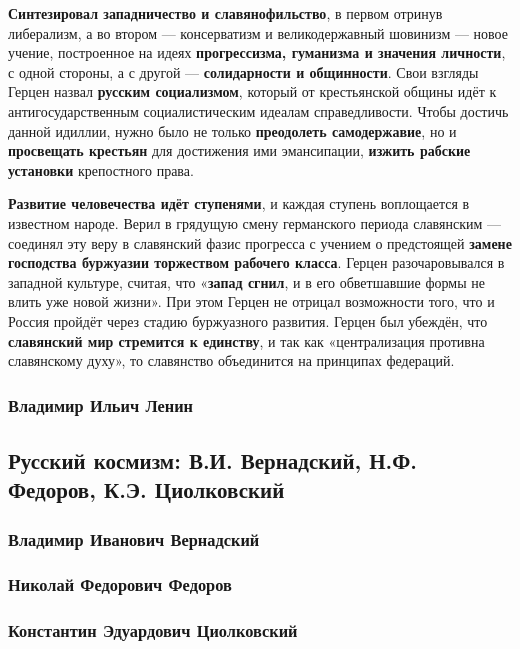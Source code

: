 \documentclass{article}
\begin{document}
\begin{flushleft}
\textbf{Синтезировал западничество и славянофильство}, в первом отринув либерализм, а во втором — консерватизм и великодержавный шовинизм — новое учение, построенное на идеях \textbf{прогрессизма, гуманизма и значения личности}, с одной стороны, а с другой — \textbf{солидарности и общинности}. Свои взгляды Герцен назвал \textbf{русским социализмом}, который от крестьянской общины идёт к антигосударственным социалистическим идеалам справедливости. Чтобы достичь данной идиллии, нужно было не только \textbf{преодолеть самодержавие}, но и \textbf{просвещать крестьян} для достижения ими эмансипации, \textbf{изжить рабские установки} крепостного права.

\hfill

\textbf{Развитие человечества идёт ступенями}, и каждая ступень воплощается в известном народе. Верил в грядущую смену германского периода славянским — соединял эту веру в славянский фазис прогресса с учением о предстоящей \textbf{замене господства буржуазии торжеством рабочего класса}. Герцен разочаровывался в западной культуре, считая, что «\textbf{запад сгнил}, и в его обветшавшие формы не влить уже новой жизни». При этом Герцен не отрицал возможности того, что и Россия пройдёт через стадию буржуазного развития. Герцен был убеждён, что \textbf{славянский мир стремится к единству}, и так как «централизация противна славянскому духу», то славянство объединится на принципах федераций.

\subsubsection{Владимир Ильич Ленин}

\subsection{Русский космизм: В.И. Вернадский, Н.Ф. Федоров, К.Э. Циолковский}

\subsubsection{Владимир Иванович Вернадский}

\subsubsection{Николай Федорович Федоров}

\subsubsection{Константин Эдуардович Циолковский}

\end{flushleft}
\end{document}
